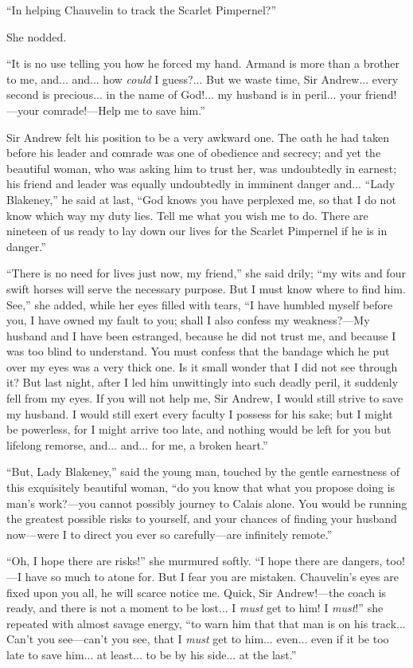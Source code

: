 \enquote{In helping Chauvelin to track the Scarlet Pimpernel?}

She nodded.

\enquote{It is no use telling you how he forced my hand. Armand is more than a brother to me, and... and... how \textit{could} I guess?... But we waste time, Sir Andrew... every second is precious... in the name of God!... my husband is in peril... your friend!---your comrade!---Help me to save him.}

Sir Andrew felt his position to be a very awkward one. The oath he had taken before his leader and comrade was one of obedience and secrecy; and yet the beautiful woman, who was asking him to trust her, was undoubtedly in earnest; his friend and leader was equally undoubtedly in imminent danger and... \enquote{Lady Blakeney,} he said at last, \enquote{God knows you have perplexed me, so that I do not know which way my duty lies. Tell me what you wish me to do. There are nineteen of us ready to lay down our lives for the Scarlet Pimpernel if he is in danger.}

\enquote{There is no need for lives just now, my friend,} she said drily; \enquote{my wits and four swift horses will serve the necessary purpose. But I must know where to find him. See,} she added, while her eyes filled with tears, \enquote{I have humbled myself before you, I have owned my fault to you; shall I also confess my weakness?---My husband and I have been estranged, because he did not trust me, and because I was too blind to understand. You must confess that the bandage which he put over my eyes was a very thick one. Is it small wonder that I did not see through it? But last night, after I led him unwittingly into such deadly peril, it suddenly fell from my eyes. If you will not help me, Sir Andrew, I would still strive to save my husband. I would still exert every faculty I possess for his sake; but I might be powerless, for I might arrive too late, and nothing would be left for you but lifelong remorse, and... and... for me, a broken heart.}

\enquote{But, Lady Blakeney,} said the young man, touched by the gentle earnestness of this exquisitely beautiful woman, \enquote{do you know that what you propose doing is man's work?---you cannot possibly journey to Calais alone. You would be running the greatest possible risks to yourself, and your chances of finding your husband now---were I to direct you ever so carefully---are infinitely remote.}

\enquote{Oh, I hope there are risks!} she murmured softly. \enquote{I hope there are dangers, too!---I have so much to atone for. But I fear you are mistaken. Chauvelin's eyes are fixed upon you all, he will scarce notice me. Quick, Sir Andrew!---the coach is ready, and there is not a moment to be lost... I \textit{must} get to him! I \textit{must}!} she repeated with almost savage energy, \enquote{to warn him that that man is on his track... Can't you see---can't you see, that I \textit{must} get to him... even... even if it be too late to save him... at least... to be by his side... at the last.}

